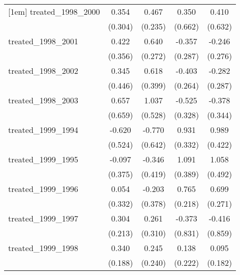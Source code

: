 {\begin{tabular}{l*{4}{c}}
[1em]
treated\_1998\_2000&       0.354         &       0.467\sym{*}  &       0.350         &       0.410         \\
            &     (0.304)         &     (0.235)         &     (0.662)         &     (0.632)         \\
[1em]
treated\_1998\_2001&       0.422         &       0.640\sym{*}  &      -0.357         &      -0.246         \\
            &     (0.356)         &     (0.272)         &     (0.287)         &     (0.276)         \\
[1em]
treated\_1998\_2002&       0.345         &       0.618         &      -0.403         &      -0.282         \\
            &     (0.446)         &     (0.399)         &     (0.264)         &     (0.287)         \\
[1em]
treated\_1998\_2003&       0.657         &       1.037\sym{*}  &      -0.525         &      -0.378         \\
            &     (0.659)         &     (0.528)         &     (0.328)         &     (0.344)         \\
[1em]
treated\_1999\_1994&      -0.620         &      -0.770         &       0.931\sym{**} &       0.989\sym{*}  \\
            &     (0.524)         &     (0.642)         &     (0.332)         &     (0.422)         \\
[1em]
treated\_1999\_1995&      -0.097         &      -0.346         &       1.091\sym{**} &       1.058\sym{*}  \\
            &     (0.375)         &     (0.419)         &     (0.389)         &     (0.492)         \\
[1em]
treated\_1999\_1996&       0.054         &      -0.203         &       0.765\sym{***}&       0.699\sym{**} \\
            &     (0.332)         &     (0.378)         &     (0.218)         &     (0.271)         \\
[1em]
treated\_1999\_1997&       0.304         &       0.261         &      -0.373         &      -0.416         \\
            &     (0.213)         &     (0.310)         &     (0.831)         &     (0.859)         \\
[1em]
treated\_1999\_1998&       0.340         &       0.245         &       0.138         &       0.095         \\
            &     (0.188)         &     (0.240)         &     (0.222)         &     (0.182)         \\

\end{tabular}}
